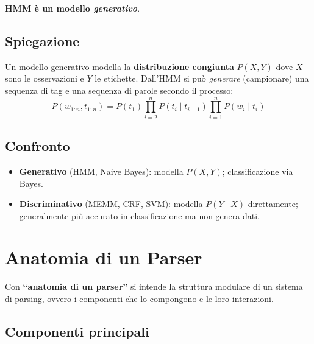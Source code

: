 \documentclass[12pt,a4paper]{article}
\begin{document}
\begin{defbox}
\textbf{HMM è un modello \emph{generativo}}.
\end{defbox}

\subsection{Spiegazione}
Un modello generativo modella la \textbf{distribuzione congiunta} $P(X, Y)$ dove $X$ sono le osservazioni e $Y$ le etichette. Dall'HMM si può \emph{generare} (campionare) una sequenza di tag e una sequenza di parole secondo il processo:
\[
P(w_{1:n}, t_{1:n}) = P(t_1) \prod_{i=2}^n P(t_i \mid t_{i-1}) \prod_{i=1}^n P(w_i \mid t_i)
\]

\subsection{Confronto}
\begin{itemize}[leftmargin=1.5em]
  \item \textbf{Generativo} (HMM, Naive Bayes): modella $P(X,Y)$; classificazione via Bayes.
  \item \textbf{Discriminativo} (MEMM, CRF, SVM): modella $P(Y \mid X)$ direttamente; generalmente più accurato in classificazione ma non genera dati.
\end{itemize}

\section{Anatomia di un Parser}

Con \textbf{``anatomia di un parser''} si intende la struttura modulare di un sistema di parsing, ovvero i componenti che lo compongono e le loro interazioni.

\subsection{Componenti principali}
\end{document}
